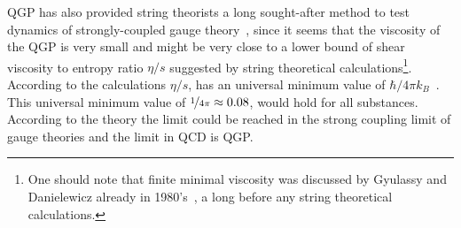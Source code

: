 




QGP has also provided string theorists a long sought-after method to test dynamics of strongly-coupled gauge theory~\cite{Peeters:2007ab}, since it seems that the viscosity of the QGP is very small and might be very close to a lower bound of shear viscosity to entropy ratio $\eta/s$ suggested by string theoretical calculations\footnote{One should note that finite minimal viscosity was discussed by Gyulassy and Danielewicz already in 1980's~\cite{PhysRevD.31.53}, a long before any string theoretical calculations.}. According to the calculations $\eta/s$, has an universal minimum value of $\hbar/4\pi k_B$~\cite{kovtun:2004de}. This universal minimum value of $\nicefrac{1}{4\pi}\approx 0.08$, would hold for all substances. According to the theory the limit could be reached in the strong coupling limit of gauge theories and the limit in QCD is QGP.

